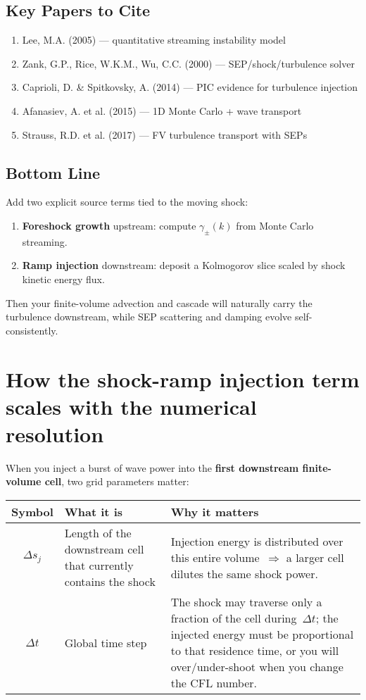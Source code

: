 \subsection*{Key Papers to Cite}

\begin{enumerate}
    \item Lee, M.A. (2005) — quantitative streaming instability model
    \item Zank, G.P., Rice, W.K.M., Wu, C.C. (2000) — SEP/shock/turbulence solver
    \item Caprioli, D. \& Spitkovsky, A. (2014) — PIC evidence for turbulence injection
    \item Afanasiev, A. et al. (2015) — 1D Monte Carlo + wave transport
    \item Strauss, R.D. et al. (2017) — FV turbulence transport with SEPs
\end{enumerate}

\subsection*{Bottom Line}

Add two explicit source terms tied to the moving shock:

\begin{enumerate}
    \item \textbf{Foreshock growth} upstream: compute $\gamma_\pm(k)$ from Monte Carlo streaming.
    \item \textbf{Ramp injection} downstream: deposit a Kolmogorov slice scaled by shock kinetic energy flux.
\end{enumerate}

Then your finite-volume advection and cascade will naturally carry the turbulence downstream, while SEP scattering and damping evolve self-consistently.

\section*{How the \textbf{shock-ramp injection term} scales with the \textbf{numerical resolution}}

When you inject a burst of wave power into the \textbf{first downstream finite-volume cell}, two grid parameters matter:

\begin{table}[H]
\centering
\begin{tabular}{|c|l|p{8cm}|}
\hline
\textbf{Symbol} & \textbf{What it is} & \textbf{Why it matters} \\
\hline
$\Delta s_j$ & Length of the downstream cell that currently contains the shock & Injection energy is distributed over this entire volume~$\Rightarrow$ a larger cell dilutes the same shock power. \\
\hline
$\Delta t$   & Global time step & The shock may traverse only a fraction of the cell during~$\Delta t$; the injected energy must be proportional to that residence time, or you will over/under-shoot when you change the CFL number. \\
\hline
\end{tabular}
\end{table}


